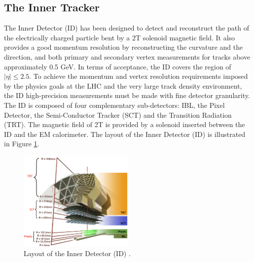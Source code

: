 \subsection{The Inner Tracker}
\label{chap2:ATLAS:ITk}
The Inner Detector (ID) has been designed to detect and reconstruct the path of the electrically charged particle bent by a 2T solenoid magnetic field. It also provides a good momentum resolution by reconstructing the curvature and the direction, and both primary and secondary vertex measurements for tracks above approximately 0.5 GeV\cite{ID_TRD, TrkVertexing}. In terms of acceptance, the ID covers the region of $|\eta|\leqslant2.5$. To achieve the momentum and vertex resolution requirements imposed by the physics goals at the LHC and the very large track density environment, the ID high-precision measurements must be made with fine detector granularity. The ID is composed of four complementary sub-detectors: IBL, the Pixel Detector, the Semi-Conductor Tracker (SCT) and the Transition Radiation (TRT). The magnetic field of 2T is provided by a solenoid inserted between the ID and the EM calorimeter. The layout of the Inner Detector (ID) is illustrated in Figure \ref{fig:chap2:ATLAS:ITK:ID}.
\begin{figure}[htbp]
    \centering
    \includegraphics[width=0.5\textwidth]{Ch2/Img/ID_withIBL.png}
    \caption{Layout of the Inner Detector (ID) \cite{ID_withIBL}.}
    \label{fig:chap2:ATLAS:ITK:ID}
\end{figure}

